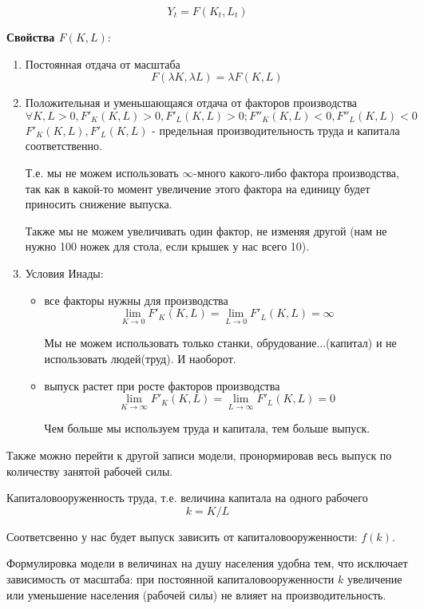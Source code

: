 \documentclass[reqno]{article}
\theoremstyle{definition}
\theoremstyle{definition}
\theoremstyle{definition}
\theoremstyle{definition}
\theoremstyle{definition}
\theoremstyle{definition}
\theoremstyle{definition}
\theoremstyle{definition}
\theoremstyle{definition}
\begin{document}
		$$Y_t=F(K_t,L_t)$$
		
		\textbf{Свойства $F(K,L)$}:
		\begin{enumerate}
			\item Постоянная отдача от масштаба 
			$$F(\lambda K, \lambda L) = \lambda F(K, L)$$
			
			\item Положительная и уменьшающаяся отдача от факторов производства
			$$\forall K,L > 0, F'_K (K, L) > 0, F'_L (K, L) > 0; F''_K (K, L) < 0, F''_L (K, L) < 0 $$
			$F'_K (K, L), F'_L (K, L)$ - предельная производительность труда и капитала соответственно.
			
			Т.е. мы не можем использовать $\infty$-много какого-либо фактора производства, так как в какой-то момент увеличение этого фактора на единицу будет приносить снижение выпуска.
			
			Также мы не можем увеличивать один фактор, не изменяя другой (нам не нужно 100 ножек для стола, если крышек у нас всего 10).
			
			\item Условия Инады:
			\begin{itemize}
				\item все факторы нужны для производства
				$$\lim_{K \rightarrow 0} F'_K (K, L) = \lim_{L \rightarrow 0} F'_L (K, L) = \infty$$
				
				Мы не можем использовать только станки, обрудование...(капитал) и не использовать людей(труд). И наоборот.
				
				\item выпуск растет при росте факторов производства
				$$\lim_{K \rightarrow \infty} F'_K (K, L) = \lim_{L \rightarrow \infty} F'_L (K, L) = 0$$
				
				Чем больше мы используем труда и капитала, тем больше выпуск.
			\end{itemize}
		\end{enumerate}
		
		Также можно перейти к другой записи модели, пронормировав весь выпуск по количеству занятой рабочей силы.
		
		Капиталовооруженность труда, т.е. величина капитала на одного рабочего 
		$$k=K/L$$
		
		Соответсвенно у нас будет выпуск зависить от капиталовооруженности: $f(k)$.
		
		Формулировка модели в величинах на душу населения удобна тем, что исключает зависимость от масштаба: при постоянной капиталовооруженности $k$ увеличение или уменьшение населения (рабочей силы) не влияет на производительность.
		
\end{document}
